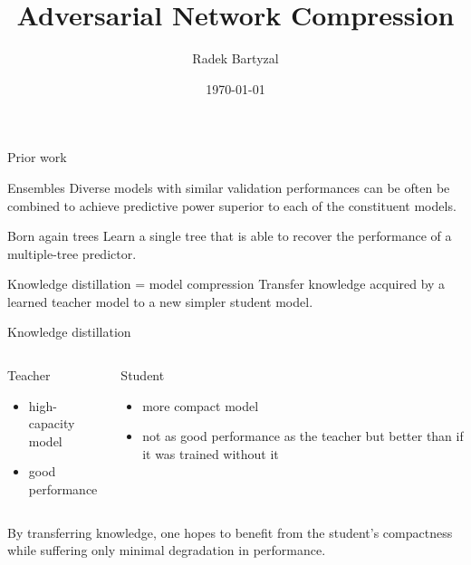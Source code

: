 \documentclass{beamer}
\begin{document}
\title{Adversarial Network Compression}  
\author{Radek Bartyzal}
\date{\today} 

\frame{\titlepage} 

\begin{frame}{Prior work}


\begin{block}{Ensembles}
Diverse models with similar validation performances can be often be combined to achieve predictive
power superior to each of the constituent models. \cite{cit:ensembles}
\end{block}

\begin{block}{Born again trees}
Learn a single tree that is able to recover the performance of a multiple-tree predictor. \cite{cit:bat}
\end{block}

\begin{block}{Knowledge distillation = model compression}
Transfer knowledge acquired by a learned
teacher model to a new simpler student model. \cite{cit:distill}
\end{block}



\end{frame}

\begin{frame}[t]{Knowledge distillation}

\begin{columns}[t]
\begin{column}{0.5\textwidth}
Teacher
\begin{itemize}
\item high-capacity model
\item good performance
\end{itemize}
\end{column}

\begin{column}{0.5\textwidth}
Student
\begin{itemize}
\item more compact model
\item not as good performance as the teacher but better than if it was trained without it
\end{itemize}
\end{column}

\end{columns}

\vfill
By transferring knowledge, one hopes to benefit from the student’s
compactness while suffering only minimal degradation in performance.

\end{frame}
\end{document}
